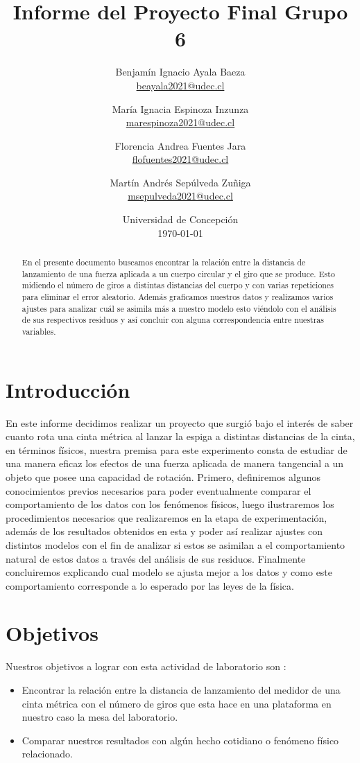 \documentclass{article}
\title{Informe del Proyecto Final Grupo 6}
\author{Benjam\'in Ignacio Ayala Baeza  \\ \href{mailto:beayala2021@udec.cl}{beayala2021@udec.cl} 
        \and Mar\'ia Ignacia Espinoza Inzunza \\ \href{mailto:marespinoza2021@udec.cl}{marespinoza2021@udec.cl} \\
        \and Florencia Andrea Fuentes Jara \\ \href{mailto:flofuentes2021@udec.cl}{flofuentes2021@udec.cl} \\
        \and Mart\'in Andrés Sepúlveda Zu\~niga \\ \href{mailto:msepulveda2021@udec.cl}{msepulveda2021@udec.cl} \\
\date{Universidad de Concepci\'on \\ \today}
}
\begin{document}
\maketitle

\begin{abstract}
En el presente documento buscamos encontrar la relación entre la distancia de lanzamiento de una fuerza aplicada a un cuerpo circular y el giro que se produce. Esto midiendo el número de giros a distintas distancias del cuerpo y con varias repeticiones para eliminar el error aleatorio. Además graficamos nuestros datos y realizamos varios ajustes para analizar cuál se asimila más a nuestro modelo esto viéndolo con el análisis de sus respectivos residuos y así concluir con alguna correspondencia entre nuestras variables.
\end{abstract}

\section{Introducción} \label{intro}
 En este informe decidimos realizar un proyecto que surgió bajo el interés de saber cuanto rota una cinta métrica al lanzar la espiga a distintas distancias de la cinta, en términos físicos, nuestra premisa para este experimento consta de estudiar de una manera eficaz los efectos de una fuerza aplicada de manera tangencial a un objeto que posee una capacidad de rotación.
 \medskip
 Primero, definiremos algunos conocimientos previos necesarios para poder eventualmente comparar el comportamiento de los datos con los fenómenos físicos, luego ilustraremos los procedimientos necesarios que realizaremos en la etapa de experimentación, además de los resultados obtenidos en esta y poder así realizar ajustes con distintos modelos con el fin de analizar si estos se asimilan a el comportamiento natural de estos datos a través del análisis de sus residuos. Finalmente concluiremos explicando cual modelo se ajusta mejor a los datos y como este comportamiento corresponde a lo esperado por las leyes de la física. 

\section{Objetivos}
Nuestros objetivos a lograr con esta actividad de laboratorio son :

\begin{itemize}
    \item Encontrar la relación entre la distancia de lanzamiento del medidor de una cinta métrica con el número de giros que esta hace en una plataforma en nuestro caso la mesa del laboratorio.
    \item Comparar nuestros resultados con algún hecho cotidiano o fenómeno físico relacionado.
\end{itemize}
\end{document}

